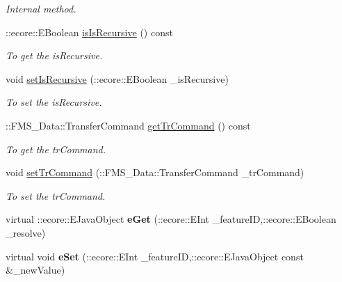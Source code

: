 \begin{DoxyCompactItemize}
\begin{DoxyCompactList}\small\item\em Internal method. \item\end{DoxyCompactList}\item 
::ecore::EBoolean \hyperlink{classFMS__Data_1_1CpFileOptions_ab6d1bcb19fa4ff3518857177221d75e1}{isIsRecursive} () const 
\begin{DoxyCompactList}\small\item\em To get the isRecursive. \item\end{DoxyCompactList}\item 
void \hyperlink{classFMS__Data_1_1CpFileOptions_ac10bea4491a59eb54188923e250a41fe}{setIsRecursive} (::ecore::EBoolean \_\-isRecursive)
\begin{DoxyCompactList}\small\item\em To set the isRecursive. \item\end{DoxyCompactList}\item 
::FMS\_\-Data::TransferCommand \hyperlink{classFMS__Data_1_1CpFileOptions_a586167481981722de43d00fb91a587a6}{getTrCommand} () const 
\begin{DoxyCompactList}\small\item\em To get the trCommand. \item\end{DoxyCompactList}\item 
void \hyperlink{classFMS__Data_1_1CpFileOptions_aa39c58be87cf4e55682b7f3247bfc2f0}{setTrCommand} (::FMS\_\-Data::TransferCommand \_\-trCommand)
\begin{DoxyCompactList}\small\item\em To set the trCommand. \item\end{DoxyCompactList}\item 
\hypertarget{classFMS__Data_1_1CpFileOptions_aab04704368465d21e46a4d3060b0e2ee}{
virtual ::ecore::EJavaObject {\bfseries eGet} (::ecore::EInt \_\-featureID,::ecore::EBoolean \_\-resolve)}
\label{classFMS__Data_1_1CpFileOptions_aab04704368465d21e46a4d3060b0e2ee}

\item 
\hypertarget{classFMS__Data_1_1CpFileOptions_a86b049f51cc0377a74e4c12355dae19f}{
virtual void {\bfseries eSet} (::ecore::EInt \_\-featureID,::ecore::EJavaObject const \&\_\-newValue)}
\label{classFMS__Data_1_1CpFileOptions_a86b049f51cc0377a74e4c12355dae19f}


\end{DoxyCompactItemize}
